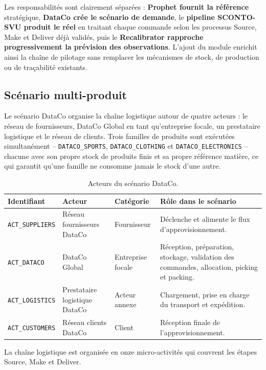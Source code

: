\documentclass[11pt,a4paper]{article}
\begin{document}
Les responsabilités sont clairement séparées : \textbf{Prophet fournit la référence} stratégique, \textbf{DataCo crée le scénario de demande}, le \textbf{pipeline SCONTO-SVU produit le réel} en traitant chaque commande selon les processus Source, Make et Deliver déjà validés, puis le \textbf{Recalibrator rapproche progressivement la prévision des observations}. L'ajout du module enrichit ainsi la chaîne de pilotage sans remplacer les mécanismes de stock, de production ou de traçabilité existants.

\subsection{Scénario multi-produit}

Le scénario DataCo organise la chaîne logistique autour de quatre acteurs : le réseau de fournisseurs, DataCo Global en tant qu'entreprise focale, un prestataire logistique et le réseau de clients. Trois familles de produits sont exécutées simultanément -- \texttt{DATACO\_SPORTS}, \texttt{DATACO\_CLOTHING} et \texttt{DATACO\_ELECTRONICS} -- chacune avec son propre stock de produits finis et sa propre référence matière, ce qui garantit qu'une famille ne consomme jamais le stock d'une autre.

\begin{table}[htbp]
\centering
\caption{Acteurs du scénario DataCo.}
\label{tab:dataco-acteurs}
\begin{tabularx}{\textwidth}{@{}p{2.7cm}p{3.4cm}p{3.4cm}X@{}}
\toprule
\textbf{Identifiant} & \textbf{Acteur} & \textbf{Catégorie} & \textbf{Rôle dans le scénario} \\
\midrule
\texttt{ACT\_SUPPLIERS} & Réseau fournisseurs DataCo & Fournisseur & Déclenche et alimente le flux d'approvisionnement. \\
\texttt{ACT\_DATACO} & DataCo Global & Entreprise focale & Réception, préparation, stockage, validation des commandes, allocation, picking et packing. \\
\texttt{ACT\_LOGISTICS} & Prestataire logistique DataCo & Acteur annexe & Chargement, prise en charge du transport et expédition. \\
\texttt{ACT\_CUSTOMERS} & Réseau clients DataCo & Client & Réception finale de l'approvisionnement. \\
\bottomrule
\end{tabularx}
\end{table}

La chaîne logistique est organisée en onze micro-activités qui couvrent les étapes Source, Make et Deliver.
\end{document}
